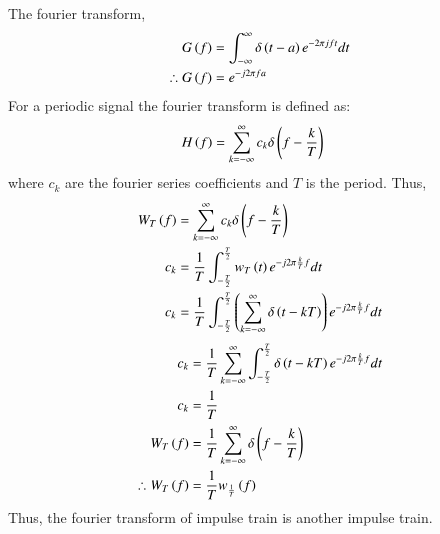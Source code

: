 \documentclass[journal,12pt,twocolumn]{IEEEtran}
\theoremstyle{remark}
\begin{document}
The fourier transform,
\begin{align}
    G\left(f\right) &= \int_{-\infty}^{\infty}\delta\left(t - a\right)e^{-2\pi jft}dt \\
    \therefore G\left(f\right) &= e^{-j2\pi fa}
\end{align}
For a periodic signal the fourier transform is defined as:
\begin{align}
    H\left(f\right) &= \sum_{k = -\infty}^{\infty}c_k\delta\left(f - \frac{k}{T}\right)
\end{align}
where $c_k$ are the fourier series coefficients and $T$ is the period. Thus,
\begin{align}
    W_T\left(f\right) &= \sum_{k = -\infty}^{\infty}c_k\delta\left(f - \frac{k}{T}\right) \\
    c_k &= \frac{1}{T}\int_{-\frac{T}{2}}^{\frac{T}{2}}w_T\left(t\right)e^{-j2\pi \frac{k}{T}f}dt \\
    c_k &= \frac{1}{T}\int_{-\frac{T}{2}}^{\frac{T}{2}}\left(\sum_{k = -\infty}^{\infty}\delta\left(t - kT\right)\right)e^{-j2\pi \frac{k}{T}f}dt \\
\end{align}
\begin{align}
    c_k &= \frac{1}{T}\sum_{k = -\infty}^{\infty}\int_{-\frac{T}{2}}^{\frac{T}{2}}\delta\left(t - kT\right)e^{-j2\pi \frac{k}{T}f}dt \\
    c_k &= \frac{1}{T} \\
    W_T\left(f\right) &= \frac{1}{T}\sum_{k = -\infty}^{\infty}\delta\left(f - \frac{k}{T}\right) \\
    \therefore W_T\left(f\right) &= \frac{1}{T}w_{\frac{1}{T}}\left(f\right)
\end{align}
Thus, the fourier transform of impulse train is another impulse train.
\end{document}
